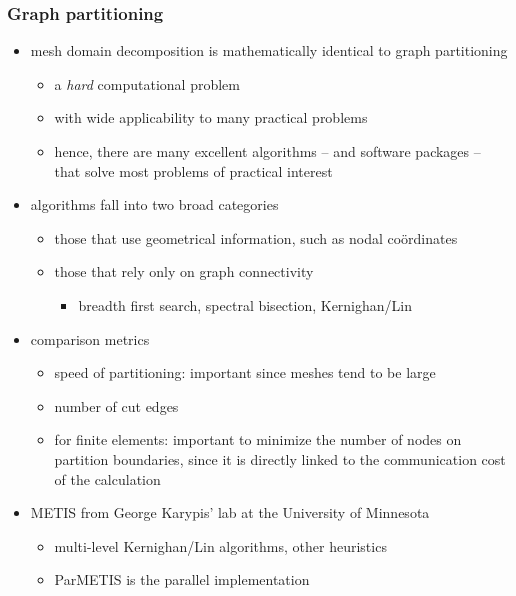 \begin{frame}[fragile]
%
  \frametitle{Graph partitioning}
%
  \begin{itemize}
%
  \item mesh domain decomposition is mathematically identical to graph partitioning
    \begin{itemize}
    \item a {\em hard} computational problem
    \item with wide applicability to many practical problems
    \item hence, there are many excellent algorithms -- and software packages -- that solve
      most problems of practical interest
    \end{itemize}
%
  \item algorithms fall into two broad categories
    \begin{itemize}
    \item those that use geometrical information, such as nodal co\"ordinates
    \item those that rely only on graph connectivity
      \begin{itemize}
      \item breadth first search, spectral bisection, Kernighan/Lin
      \end{itemize}
    \end{itemize}
%
  \item comparison metrics
    \begin{itemize}
    \item speed of partitioning: important since meshes tend to be large
    \item number of cut edges
    \item for finite elements: important to minimize the number of nodes on partition
      boundaries, since it is directly linked to the communication cost of the calculation
    \end{itemize}
%
  \item METIS from George Karypis' lab at the University of Minnesota
    \begin{itemize}
    \item multi-level Kernighan/Lin algorithms, other heuristics
    \item ParMETIS is the parallel implementation
    \end{itemize}
%
  \end{itemize}
%
\end{frame}

